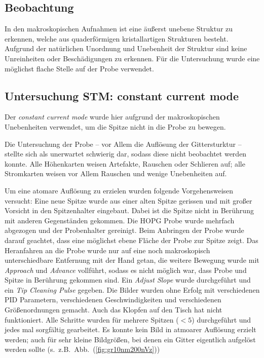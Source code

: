 \documentclass[sn-mathphys-num,iicol]{sn-jnl}
\theoremstyle{thmstyleone}
\theoremstyle{thmstyletwo}
\theoremstyle{thmstylethree}
\begin{document}
\subsection{Beobachtung}
In den makroskopischen Aufnahmen ist eine äußerst unebene Struktur zu erkennen, welche aus quaderförmigen kristallartigen Strukturen besteht. %
Aufgrund der natürlichen Unordnung und Unebenheit der Struktur sind keine Unreinheiten oder Beschädigungen zu erkennen.
Für die Untersuchung wurde eine möglichst flache Stelle auf der Probe verwendet.

\subsection{Untersuchung STM: constant current mode}
Der \textit{constant current mode} wurde hier aufgrund der makroskopischen Unebenheiten verwendet, um die Spitze nicht in die Probe zu bewegen.

Die Untersuchung der Probe -- vor Allem die Auflösung der Gittersturktur -- stellte sich als unerwartet schwierig dar, sodass diese nicht beobachtet werden konnte.
Alle Höhenkarten weisen Artefakte, Rauschen oder Schlieren auf; alle Stromkarten weisen vor Allem Rauschen und wenige Unebenheiten auf.

Um eine atomare Auflösung zu erzielen wurden folgende Vorgehensweisen versucht:
Eine neue Spitze wurde aus einer alten Spitze gerissen und mit großer Vorsicht in den Spitzenhalter eingebaut.
Dabei ist die Spitze nicht in Berührung mit anderen Gegenständen gekommen.
Die HOPG Probe wurde mehrfach abgezogen und der Probenhalter gereinigt.
Beim Anbringen der Probe wurde darauf geachtet, dass eine möglichst ebene Fläche der Probe zur Spitze zeigt.
Das Heranfahren an die Probe wurde nur auf eine noch makroskopisch unterschiedbare Entfernung mit der Hand getan, die weitere Bewegung wurde mit \textit{Approach} und \textit{Advance} vollführt, sodass es nicht möglich war, dass Probe und Spitze in Berührung gekommen sind.
Ein \textit{Adjust Slope} wurde durchgeführt und ein \textit{Tip Cleaning Pulse} gegeben.
Die Bilder wurden ohne Erfolg mit verschiedenen PID Parametern, verschiedenen Geschwindigkeiten und verschiedenen Größenordnungen gemacht.
Auch das Klopfen auf den Tisch hat nicht funktioniert.
Alle Schritte wurden für mehrere Spitzen ($<5$) durchgeführt und jedes mal sorgfältig gearbeitet.
Es konnte kein Bild in atmoarer Auflösung erzielt werden; auch für sehr kleine Bildgrößen, bei denen ein Gitter eigentlich aufgelöst werden sollte (s.\ z.B.\ Abb.\ (\ref{fig:gr10nm200nVz}))
\end{document}
